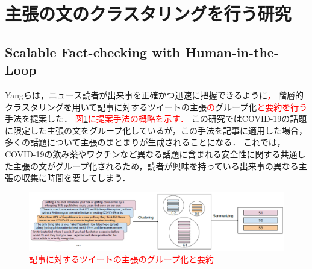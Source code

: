 \documentclass[12pt,a4j]{jreport}
\begin{document}


\section{主張の文のクラスタリングを行う研究}

\subsection{Scalable Fact-checking with Human-in-the-Loop}
\label{subsection_scalable_fact_checking}

Yangらは，ニュース読者が出来事を正確かつ迅速に把握できるように\textcolor{red}{，}
階層的クラスタリングを用いて記事に対するツイートの主張\textcolor{red}{の}グループ化\textcolor{red}{と要約を行う}手法を提案した\cite{yang_scalable_2021}．
\textcolor{red}{図\ref{fig_scalable_fact_checking_pipeline}に提案手法の概略を示す．}
この研究ではCOVID-19の話題に限定した主張の文をグループ化しているが，この手法を記事に適用した場合，多くの話題について主張のまとまりが生成されることになる．
これでは，COVID-19の飲み薬やワクチンなど異なる話題に含まれる安全性に関する共通した主張の文がグループ化されるため，読者が興味を持っている出来事の異なる主張の収集に時間を要してしまう．

\begin{figure}[H]
	\centering
	\includegraphics[keepaspectratio, width=120mm]{img/scalable_fact_checking_pipeline.png}
	\caption{
    \textcolor{red}{記事に対するツイートの主張のグループ化と要約}
    \protect\footnotemark[14]
  }
	\label{fig_scalable_fact_checking_pipeline}
\end{figure}
\end{document}
